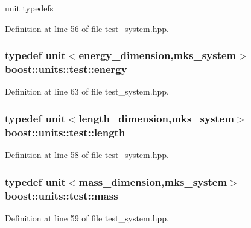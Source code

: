unit typedefs 



Definition at line 56 of file test\+\_\+system.\+hpp.

\subsubsection[{\texorpdfstring{energy}{energy}}]{\setlength{\rightskip}{0pt plus 5cm}typedef unit$<${\bf energy\+\_\+dimension},{\bf mks\+\_\+system}$>$ {\bf boost\+::units\+::test\+::energy}}\hypertarget{namespaceboost_1_1units_1_1test_a5a1d8a7c46b82b43a4f4cd4a0ddcec59}{}\label{namespaceboost_1_1units_1_1test_a5a1d8a7c46b82b43a4f4cd4a0ddcec59}


Definition at line 63 of file test\+\_\+system.\+hpp.

\subsubsection[{\texorpdfstring{length}{length}}]{\setlength{\rightskip}{0pt plus 5cm}typedef unit$<${\bf length\+\_\+dimension},{\bf mks\+\_\+system}$>$ {\bf boost\+::units\+::test\+::length}}\hypertarget{namespaceboost_1_1units_1_1test_abb80de321402f6f139e1a1b182ea4655}{}\label{namespaceboost_1_1units_1_1test_abb80de321402f6f139e1a1b182ea4655}


Definition at line 58 of file test\+\_\+system.\+hpp.

\subsubsection[{\texorpdfstring{mass}{mass}}]{\setlength{\rightskip}{0pt plus 5cm}typedef unit$<${\bf mass\+\_\+dimension},{\bf mks\+\_\+system}$>$ {\bf boost\+::units\+::test\+::mass}}\hypertarget{namespaceboost_1_1units_1_1test_ac20a8750e8cda0bf9f5ab0571dec9210}{}\label{namespaceboost_1_1units_1_1test_ac20a8750e8cda0bf9f5ab0571dec9210}


Definition at line 59 of file test\+\_\+system.\+hpp.

